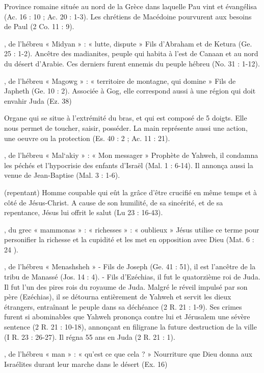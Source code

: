 \begin{multicols}{2}
Province romaine située au nord de la Grèce dans laquelle Pau vint et évangélisa (Ac. 16 : 10 ; Ac. 20 : 1-3). Les chrétiens de Macédoine pourvurent aux besoins de Paul (2 Co. 11 : 9).


, de l'hébreu « Midyan » : « lutte, dispute »
Fils d'Abraham et de Ketura (Ge. 25 : 1-2).
Ancêtre des madianites, peuple qui habita à l'est de Canaan et au nord du désert d'Arabie. Ces derniers furent ennemis du peuple hébreu (No. 31 : 1-12).


, de l'hébreu « Magowg » : « territoire de montagne, qui domine »
Fils de Japheth (Ge. 10 : 2). Associée à Gog, elle correspond aussi à une région qui doit envahir Juda (Ez. 38)


Organe qui se situe à l'extrémité du bras, et qui est composé de 5 doigts. Elle nous permet de toucher, saisir, posséder. La main représente aussi une action, une oeuvre ou la protection (Es. 40 : 2 ; Ac. 11 : 21).


, de l'hébreu « Mal`akiy » : « Mon messager »
Prophète de Yahweh, il condamna les péchés et l'hypocrisie des enfants d'Israël (Mal. 1 : 6-14). Il annonça aussi la venue de Jean-Baptise (Mal. 3 : 1-6).


(repentant)
Homme coupable qui eût la grâce d'être crucifié en même temps et à côté de Jésus-Christ. A cause de son humilité, de sa sincérité, et de sa repentance, Jésus lui offrit le salut (Lu 23 : 16-43).


, du grec « mammonas » : « richesses » : « oublieux »
Jésus utilise ce terme pour personifier la richesse et la cupidité et les met en opposition avec Dieu (Mat. 6 : 24 ).

, de l'hébreu « Menashsheh »
- Fils de Joseph (Ge. 41 : 51), il est l'ancêtre de la tribu de Manassé (Jos. 14 : 4).
- Fils d'Ezéchias, il fut le quatorzième roi de Juda. Il fut l'un des pires rois du royaume de Juda. Malgré le réveil impulsé par son père (Ezéchias), il se détourna entièrement de Yahweh et servit les dieux étrangers, entraînant le peuple dans sa déchéance (2 R. 21 : 1-9). Ses crimes furent si abominables que Yahweh prononça contre lui et Jérusalem une sévère sentence (2 R. 21 : 10-18), annonçant en filigrane la future destruction de la ville (I R. 23 : 26-27). Il régna 55 ans en Juda (2 R. 21 : 1).


, de l'hébreu « man » : « qu'est ce que cela ? »
Nourriture que Dieu donna aux Israélites durant leur marche dans le désert (Ex. 16)



\end{multicols}
